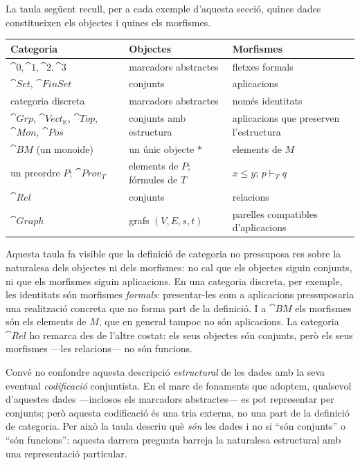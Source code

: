 La taula següent recull, per a cada exemple d'aquesta secció, quines dades constitueixen els objectes i quines els morfismes.

\begin{center}
\footnotesize
\setlength{\tabcolsep}{6pt}
\begin{tabularx}{\linewidth}{@{}>{\raggedright\arraybackslash}X>{\raggedright\arraybackslash}X>{\raggedright\arraybackslash}X@{}}
\toprule
Categoria & Objectes & Morfismes \\
\midrule
$\cat{0},\cat{1},\cat{2},\cat{3}$ & marcadors abstractes & fletxes formals \\
$\cat{Set}$, $\cat{FinSet}$ & conjunts & aplicacions \\
categoria discreta & marcadors abstractes & només identitats \\
$\cat{Grp}$, $\cat{Vect}_{\mathbb K}$, $\cat{Top}$, $\cat{Mon}$, $\cat{Pos}$ & conjunts amb estructura & aplicacions que preserven l'estructura \\
$\cat{B}M$ (un monoide) & un únic objecte $\ast$ & elements de $M$ \\
un preordre $P$; $\cat{Prov}_T$ & elements de $P$; fórmules de $T$ & $x\le y$; $p\vdash_T q$ \\
$\cat{Rel}$ & conjunts & relacions \\
$\cat{Graph}$ & grafs $(V,E,s,t)$ & parelles compatibles d'aplicacions \\
\bottomrule
\end{tabularx}
\end{center}

Aquesta taula fa visible que la definició de categoria no pressuposa res sobre la naturalesa dels objectes ni dels morfismes: no cal que els objectes siguin conjunts, ni que els morfismes siguin aplicacions. En una categoria discreta, per exemple, les identitats són morfismes \emph{formals}: presentar-les com a aplicacions pressuposaria una realització concreta que no forma part de la definició. I a $\cat{B}M$ els morfismes són els elements de $M$, que en general tampoc no són aplicacions. La categoria $\cat{Rel}$ ho remarca des de l'altre costat: els seus objectes són conjunts, però els seus morfismes ---les relacions--- no són funcions.

Convé no confondre aquesta descripció \emph{estructural} de les dades amb la seva eventual \emph{codificació} conjuntista. En el marc de fonaments que adoptem, qualsevol d'aquestes dades ---inclosos els marcadors abstractes--- es pot representar per conjunts; però aquesta codificació és una tria externa, no una part de la definició de categoria. Per això la taula descriu què \emph{són} les dades i no si \enquote{són conjunts} o \enquote{són funcions}: aquesta darrera pregunta barreja la naturalesa estructural amb una representació particular.

